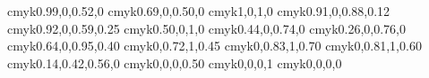 \definecolor{JungleGreen}   {cmyk}{0.99,0,0.52,0}
\definecolor{SeaGreen}      {cmyk}{0.69,0,0.50,0}
\definecolor{Green}         {cmyk}{1,0,1,0}
\definecolor{ForestGreen}   {cmyk}{0.91,0,0.88,0.12}
\definecolor{PineGreen}     {cmyk}{0.92,0,0.59,0.25}
\definecolor{LimeGreen}     {cmyk}{0.50,0,1,0}
\definecolor{YellowGreen}   {cmyk}{0.44,0,0.74,0}
\definecolor{SpringGreen}   {cmyk}{0.26,0,0.76,0}
\definecolor{OliveGreen}    {cmyk}{0.64,0,0.95,0.40}
\definecolor{RawSienna}     {cmyk}{0,0.72,1,0.45}
\definecolor{Sepia}         {cmyk}{0,0.83,1,0.70}
\definecolor{Brown}         {cmyk}{0,0.81,1,0.60}
\definecolor{Tan}           {cmyk}{0.14,0.42,0.56,0}
\definecolor{Gray}          {cmyk}{0,0,0,0.50}
\definecolor{Black}         {cmyk}{0,0,0,1}
\definecolor{White}         {cmyk}{0,0,0,0}
\endinput
